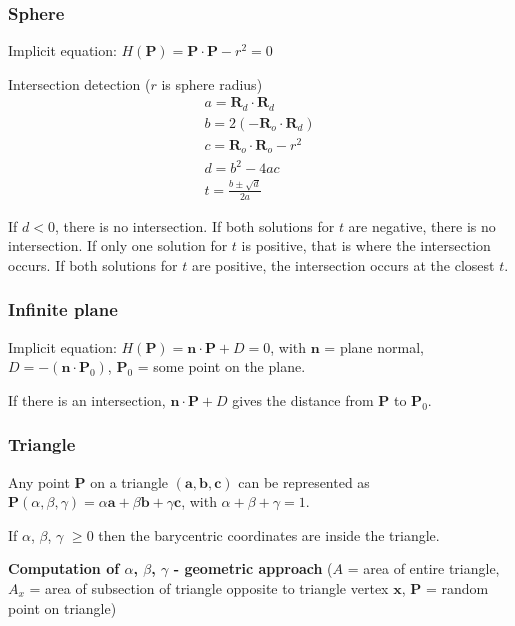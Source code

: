 \documentclass[12pt]{article}
\begin{document}
\subsubsection{Sphere}

Implicit equation: $H(\bm P) = \bm P \cdot \bm P - r^2 = 0$

Intersection detection ($r$ is sphere radius)
\begin{gather*}
    a = \bm R_d \cdot \bm R_d\\
    b = 2(-\bm R_o \cdot \bm R_d)\\
    c = \bm R_o \cdot \bm R_o - r^2\\
    d = b^2 - 4ac\\
    t = \frac{b \pm \sqrt{d}}{2a}
\end{gather*}

If $d < 0$, there is no intersection. If both solutions for $t$
are negative, there is no intersection.
If only one solution for $t$ is positive, that is where the
intersection occurs. If both solutions for $t$ are positive,
the intersection occurs at the closest $t$.

\subsubsection{Infinite plane}

Implicit equation: $H(\bm P) = \bm n \cdot \bm P + D = 0$, with $\bm n$
= plane normal, $D = -(\bm n \cdot \bm P_0)$, $\bm P_0$ = some point on
the plane.

If there is an intersection, $\bm n \cdot \bm P + D$ gives the distance from
$\bm P$ to $\bm P_0$.

\subsubsection{Triangle}

Any point $\bm P$ on a triangle $(\bm a,\bm b,\bm c)$ can be represented as $\bm P(
\alpha,\beta,\gamma) = \alpha \bm a + \beta \bm b + \gamma \bm
c$, with $\alpha + \beta + \gamma = 1$.

If $\alpha$, $\beta$, $\gamma$ $\ge 0$ then the barycentric coordinates are inside
the triangle.

\textbf{Computation of $\alpha$, $\beta$, $\gamma$ - geometric approach} ($A$ = area
of entire triangle, $A_x$ = area of subsection of triangle opposite to
triangle vertex $\bm x$, $\bm P$ = random point on triangle)

\end{document}
